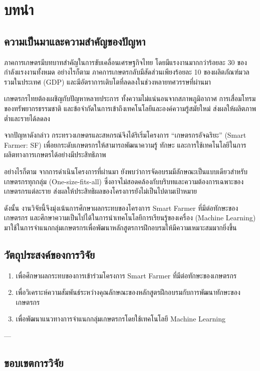 \chapter{บทนำ}

\section{ความเป็นมาและความสำคัญของปัญหา}

ภาคการเกษตรมีบทบาทสำคัญในการขับเคลื่อนเศรษฐกิจไทย โดยมีแรงงานมากกว่าร้อยละ 30 ของกำลังแรงงานทั้งหมด อย่างไรก็ตาม ภาคการเกษตรกลับมีสัดส่วนเพียงร้อยละ 10 ของผลิตภัณฑ์มวลรวมในประเทศ (GDP) และมีอัตราการเติบโตที่ลดลงในช่วงหลายทศวรรษที่ผ่านมา

เกษตรกรไทยต้องเผชิญกับปัญหาหลายประการ ทั้งความไม่แน่นอนจากสภาพภูมิอากาศ การเสื่อมโทรมของทรัพยากรธรรมชาติ และข้อจำกัดในการเข้าถึงเทคโนโลยีและองค์ความรู้สมัยใหม่ ส่งผลให้ผลิตภาพต่ำและรายได้ลดลง

จากปัญหาดังกล่าว กระทรวงเกษตรและสหกรณ์จึงได้ริเริ่มโครงการ “เกษตรกรอัจฉริยะ” (Smart Farmer: SF) เพื่อยกระดับเกษตรกรให้สามารถพัฒนาความรู้ ทักษะ และการใช้เทคโนโลยีในการผลิตทางการเกษตรได้อย่างมีประสิทธิภาพ

อย่างไรก็ตาม จากการดำเนินโครงการที่ผ่านมา ยังพบว่าการจัดอบรมมีลักษณะเป็นแบบเดียวสำหรับเกษตรกรทุกกลุ่ม (One-size-fits-all) ซึ่งอาจไม่สอดคล้องกับบริบทและความต้องการเฉพาะของเกษตรกรแต่ละราย ส่งผลให้ประสิทธิผลของโครงการยังไม่เป็นไปตามเป้าหมาย

ดังนั้น งานวิจัยนี้จึงมุ่งเน้นการศึกษาผลกระทบของโครงการ Smart Farmer ที่มีต่อทักษะของเกษตรกร และศึกษาความเป็นไปได้ในการนำเทคโนโลยีการเรียนรู้ของเครื่อง (Machine Learning) มาใช้ในการจำแนกกลุ่มเกษตรกรเพื่อพัฒนาหลักสูตรการฝึกอบรมให้มีความเหมาะสมมากยิ่งขึ้น

\section{วัตถุประสงค์ของการวิจัย}

\begin{enumerate}
\item เพื่อศึกษาผลกระทบของการเข้าร่วมโครงการ Smart Farmer ที่มีต่อทักษะของเกษตรกร
\item เพื่อวิเคราะห์ความสัมพันธ์ระหว่างคุณลักษณะของหลักสูตรฝึกอบรมกับการพัฒนาทักษะของเกษตรกร
\item เพื่อพัฒนาแนวทางการจำแนกกลุ่มเกษตรกรโดยใช้เทคโนโลยี Machine Learning
\end{enumerate}

---

\section{ขอบเขตการวิจัย}

